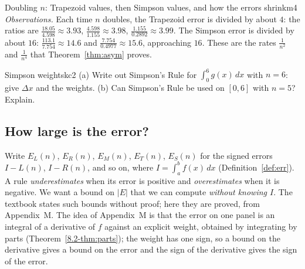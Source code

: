 \documentclass[11pt]{article}
\begin{document}
\begin{exmp}{Doubling $n$: Trapezoid values, then Simpson values, and how the errors shrink}{m4}
\emph{Observations.} Each time $n$ doubles, the Trapezoid error is divided by about $4$: the ratios are $\frac{18.05}{4.598}\approx3.93$, $\frac{4.598}{1.155}\approx3.98$, $\frac{1.155}{0.2892}\approx3.99$. The Simpson error is divided by about $16$: $\frac{113.1}{7.754}\approx14.6$ and $\frac{7.754}{0.4977}\approx15.6$, approaching $16$. These are the rates $\frac1{n^2}$ and $\frac1{n^4}$ that Theorem~\ref{thm:asym} proves.
\end{exmp}

\begin{kc}{Simpson weights}{kc2}
(a) Write out Simpson's Rule for $\int_0^6g(x)\,dx$ with $n=6$: give $\Delta x$ and the weights. (b) Can Simpson's Rule be used on $[0,6]$ with $n=5$? Explain.
\end{kc}

\subsection*{How large is the error?}

Write $E_L(n)$, $E_R(n)$, $E_M(n)$, $E_T(n)$, $E_S(n)$ for the signed errors $I-L(n)$, $I-R(n)$, and so on, where $I=\int_a^bf(x)\,dx$ (Definition~\ref{def:err}). A rule \emph{underestimates} when its error is positive and \emph{overestimates} when it is negative. We want a bound on $\lvert E\rvert$ that we can compute \emph{without knowing $I$}. The textbook states such bounds without proof; here they are proved, from Appendix~M. The idea of Appendix~M is that the error on one panel is an integral of a derivative of $f$ against an explicit weight, obtained by integrating by parts (Theorem~\ref{8.2-thm:parts}); the weight has one sign, so a bound on the derivative gives a bound on the error and the sign of the derivative gives the sign of the error.
\end{document}

